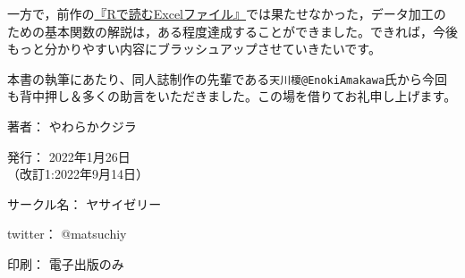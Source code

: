 \documentclass[
  xelatex,ja=standard, b5paper]{bxjsbook}
\begin{document}
一方で，前作の\href{https://techbookfest.org/product/4794168259903488?productVariantID=5913872206659584}{『Rで読むExcelファイル』}では果たせなかった，データ加工のための基本関数の解説は，ある程度達成することができました。できれば，今後もっと分かりやすい内容にブラッシュアップさせていきたいです。

本書の執筆にあたり、同人誌制作の先輩である\texttt{天川榎@EnokiAmakawa}氏から今回も背中押し＆多くの助言をいただきました。この場を借りてお礼申し上げます。

\clearpage
{}
\begin{flushright}
\begin{minipage}{0.5\hsize}
\begin{description}
  \item{著者：} やわらかクジラ
  \item{発行：} 2022年1月26日\\（改訂1:2022年9月14日）
  \item{サークル名：} ヤサイゼリー
  \item{twitter：} @matsuchiy
  \item{印刷：} 電子出版のみ
\end{description}
\end{minipage}
\end{flushright}
\clearpage
\end{document}
